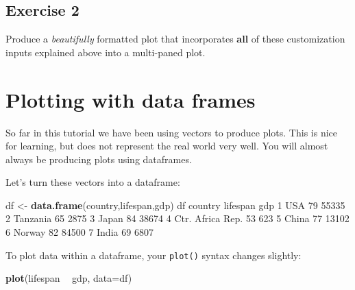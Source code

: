 \documentclass[
]{book}
\newenvironment{Shaded}{\begin{snugshade}}{\end{snugshade}}
\newcommand{\DataTypeTok}[1]{\textcolor[rgb]{0.13,0.29,0.53}{#1}}
\newcommand{\DecValTok}[1]{\textcolor[rgb]{0.00,0.00,0.81}{#1}}
\newcommand{\KeywordTok}[1]{\textcolor[rgb]{0.13,0.29,0.53}{\textbf{#1}}}
\newcommand{\NormalTok}[1]{#1}
\newcommand{\OperatorTok}[1]{\textcolor[rgb]{0.81,0.36,0.00}{\textbf{#1}}}
\newcommand{\StringTok}[1]{\textcolor[rgb]{0.31,0.60,0.02}{#1}}
\begin{document}
\hypertarget{exercise-2-3}{%
\subsection*{Exercise 2}\label{exercise-2-3}}

Produce a \emph{beautifully} formatted plot that incorporates \textbf{all} of these customization inputs explained above into a multi-paned plot.

\hypertarget{plotting-with-data-frames}{%
\section*{Plotting with data frames}\label{plotting-with-data-frames}}

So far in this tutorial we have been using vectors to produce plots. This is nice for learning, but does not represent the real world very well. You will almost always be producing plots using dataframes.

Let's turn these vectors into a dataframe:

\begin{Shaded}
\begin{Highlighting}[]
\NormalTok{df <-}\StringTok{ }\KeywordTok{data.frame}\NormalTok{(country,lifespan,gdp)}
\NormalTok{df}
\NormalTok{           country lifespan   gdp}
\DecValTok{1}\NormalTok{              USA       }\DecValTok{79} \DecValTok{55335}
\DecValTok{2}\NormalTok{         Tanzania       }\DecValTok{65}  \DecValTok{2875}
\DecValTok{3}\NormalTok{            Japan       }\DecValTok{84} \DecValTok{38674}
\DecValTok{4}\NormalTok{ Ctr. Africa Rep.       }\DecValTok{53}   \DecValTok{623}
\DecValTok{5}\NormalTok{            China       }\DecValTok{77} \DecValTok{13102}
\DecValTok{6}\NormalTok{           Norway       }\DecValTok{82} \DecValTok{84500}
\DecValTok{7}\NormalTok{            India       }\DecValTok{69}  \DecValTok{6807}
\end{Highlighting}
\end{Shaded}

To plot data within a dataframe, your \texttt{plot()} syntax changes slightly:

\begin{Shaded}
\begin{Highlighting}[]
\KeywordTok{plot}\NormalTok{(lifespan }\OperatorTok{~}\StringTok{ }\NormalTok{gdp, }\DataTypeTok{data=}\NormalTok{df)}
\end{Highlighting}
\end{Shaded}
\end{document}
